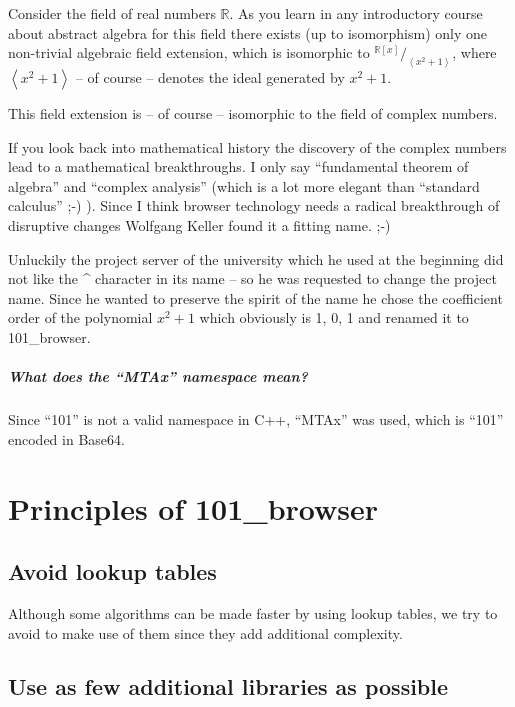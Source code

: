 \documentclass[10pt]{scrbook}
\begin{document}
Consider the field of real numbers $\mathbb{R}$. As you learn in any introductory course about abstract algebra for this field there exists (up to isomorphism) only one non-trivial algebraic field extension, which is isomorphic to $^{\mathbb{R}[x]}/_{\left\langle x^2+1\right\rangle}$, where $\left\langle x^2+1\right\rangle$ -- of course -- denotes the ideal generated by $x^2+1$.

This field extension is -- of course -- isomorphic to the field of complex numbers.

If you look back into mathematical history the discovery of the complex numbers lead to a mathematical breakthroughs. I only say "`fundamental theorem of algebra"' and "`complex analysis"' (which is a lot more elegant than "`standard calculus"' ;-) ). Since I think browser technology needs a radical breakthrough of disruptive changes Wolfgang Keller found it a fitting name. ;-)

Unluckily the project server of the university which he used at the beginning did not like the \^{} character in its name -- so he was requested to change the project name. Since he wanted to preserve the spirit of the name he chose the coefficient order of the polynomial $x^2+1$ which obviously is 1, 0, 1 and renamed it to 101\_browser.

\paragraph{What does the "`MTAx"' namespace mean?}

Since "`101"' is not a valid namespace in C++, "`MTAx"' was used, which is "`101"' encoded in Base64.

\chapter{Principles of 101\_browser}

\section{Avoid lookup tables}

Although some algorithms can be made faster by using lookup tables, we try to avoid to make use of them since they add additional complexity.

\section{Use as few additional libraries as possible}
\end{document}
